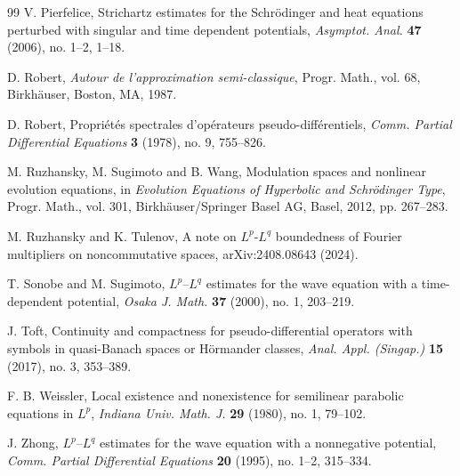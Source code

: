 \documentclass[12pt, reqno]{amsart}
\theoremstyle{definition}
\theoremstyle{remark}
\numberwithin{equation}{section}
\begin{document}
\begin{thebibliography}{99}
V. Pierfelice,
Strichartz estimates for the Schr\"odinger and heat equations perturbed with singular and time dependent potentials,
\emph{Asymptot. Anal.} \textbf{47} (2006), no. 1--2, 1--18.

D. Robert,
\emph{Autour de l'approximation semi-classique},
Progr. Math., vol. 68, Birkh\"auser, Boston, MA, 1987.

D. Robert,
Propri\'et\'es spectrales d'op\'erateurs pseudo-diff\'erentiels,
\emph{Comm. Partial Differential Equations} \textbf{3} (1978), no. 9, 755--826.


M. Ruzhansky, M. Sugimoto and B. Wang,
Modulation spaces and nonlinear evolution equations,
in \emph{Evolution Equations of Hyperbolic and Schr\"odinger Type},
Progr. Math., vol. 301, Birkh\"auser/Springer Basel AG, Basel, 2012, pp. 267--283.

M. Ruzhansky and K. Tulenov,
A note on $L^p$-$L^q$ boundedness of Fourier multipliers on noncommutative spaces,
arXiv:2408.08643 (2024).



T. Sonobe and M. Sugimoto,
$L^p$--$L^q$ estimates for the wave equation with a time-dependent potential,
\emph{Osaka J. Math.} \textbf{37} (2000), no. 1, 203--219.

J. Toft,
Continuity and compactness for pseudo-differential operators with symbols in quasi-Banach spaces or H\"ormander classes,
\emph{Anal. Appl. (Singap.)} \textbf{15} (2017), no. 3, 353--389.



F. B. Weissler,
Local existence and nonexistence for semilinear parabolic equations in $L^p$,
\emph{Indiana Univ. Math. J.} \textbf{29} (1980), no. 1, 79--102.




J. Zhong,
$L^p$--$L^q$ estimates for the wave equation with a nonnegative potential,
\emph{Comm. Partial Differential Equations} \textbf{20} (1995), no. 1--2, 315--334.

\end{thebibliography}
\end{document}
